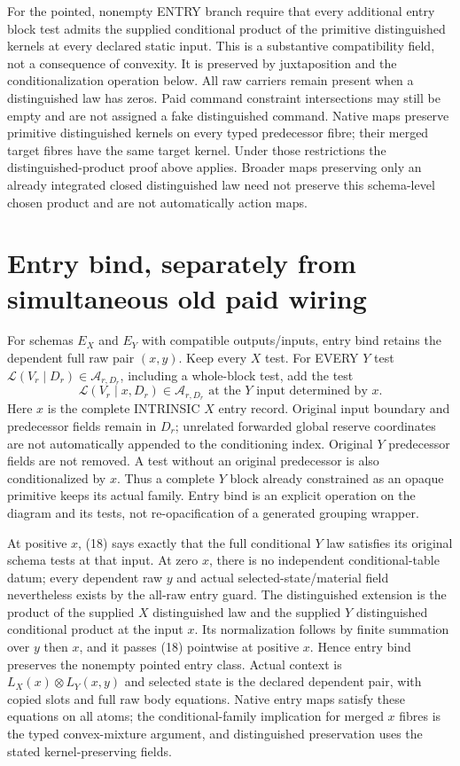 \documentclass[11pt]{article}
\begin{document}
For the pointed, nonempty ENTRY branch require that every additional entry block test admits the supplied conditional product of the primitive distinguished kernels at every declared static input. This is a substantive compatibility field, not a consequence of convexity. It is preserved by juxtaposition and the conditionalization operation below. All raw carriers remain present when a distinguished law has zeros. Paid command constraint intersections may still be empty and are not assigned a fake distinguished command. Native maps preserve primitive distinguished kernels on every typed predecessor fibre; their merged target fibres have the same target kernel. Under those restrictions the distinguished-product proof above applies. Broader maps preserving only an already integrated closed distinguished law need not preserve this schema-level chosen product and are not automatically action maps.

\section{Entry bind, separately from simultaneous old paid wiring}
For schemas $E_X$ and $E_Y$ with compatible outputs/inputs, entry bind retains the dependent full raw pair $(x,y)$. Keep every $X$ test. For EVERY $Y$ test
$\mathcal L(V_r\mid D_r)\in\mathcal A_{r,D_r}$, including a whole-block test, add the test
\[
 \mathcal L(V_r\mid x,D_r)\in
       \mathcal A_{r,D_r}\text{ at the }Y\text{ input determined by }x.
                                                               \tag{18}
\]
Here $x$ is the complete INTRINSIC $X$ entry record. Original input boundary and predecessor fields remain in $D_r$; unrelated forwarded global reserve coordinates are not automatically appended to the conditioning index. Original $Y$ predecessor fields are not removed. A test without an original predecessor is also conditionalized by $x$. Thus a complete $Y$ block already constrained as an opaque primitive keeps its actual family. Entry bind is an explicit operation on the diagram and its tests, not re-opacification of a generated grouping wrapper.

At positive $x$, (18) says exactly that the full conditional $Y$ law satisfies its original schema tests at that input. At zero $x$, there is no independent conditional-table datum; every dependent raw $y$ and actual selected-state/material field nevertheless exists by the all-raw entry guard. The distinguished extension is the product of the supplied $X$ distinguished law and the supplied $Y$ distinguished conditional product at the input $x$. Its normalization follows by finite summation over $y$ then $x$, and it passes (18) pointwise at positive $x$. Hence entry bind preserves the nonempty pointed entry class. Actual context is $L_X(x)\otimes L_Y(x,y)$ and selected state is the declared dependent pair, with copied slots and full raw body equations. Native entry maps satisfy these equations on all atoms; the conditional-family implication for merged $x$ fibres is the typed convex-mixture argument, and distinguished preservation uses the stated kernel-preserving fields.
\end{document}
